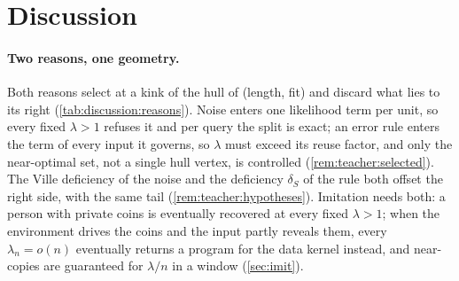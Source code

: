 \section{Discussion}\label{sec:discussion}

\paragraph{Two reasons, one geometry.} Both reasons select at a kink of the hull of (length, fit) and discard what lies to its right (\cref{tab:discussion:reasons}). Noise enters one likelihood term per unit, so every fixed $\lambda>1$ refuses it and per query the split is exact; an error rule enters the term of every input it governs, so $\lambda$ must exceed its reuse factor, and only the near-optimal set, not a single hull vertex, is controlled (\cref{rem:teacher:selected}). The Ville deficiency of the noise and the deficiency $\delta_S$ of the rule both offset the right side, with the same tail (\cref{rem:teacher:hypotheses}). Imitation needs both: a person with private coins is eventually recovered at every fixed $\lambda>1$; when the environment drives the coins and the input partly reveals them, every $\lambda_n=o(n)$ eventually returns a program for the data kernel instead, and near-copies are guaranteed for $\lambda/n$ in a window (\cref{sec:imit}).

